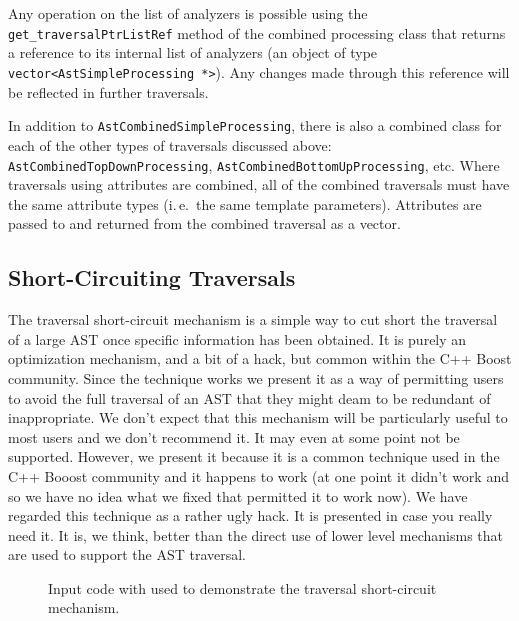 Any operation on the list of analyzers is possible using the {\tt
get\_traversalPtrListRef} method of the combined processing class that returns
a reference to its internal list of analyzers (an object of type {\tt
vector<AstSimpleProcessing *>}). Any changes made through this reference will
be reflected in further traversals.

In addition to {\tt AstCombinedSimpleProcessing}, there is also a combined
class for each of the other types of traversals discussed above: {\tt
AstCombinedTopDownProcessing}, {\tt AstCombinedBottomUpProcessing}, etc. Where
traversals using attributes are combined, all of the combined traversals must
have the same attribute types (i.\,e.~the same template parameters). Attributes
are passed to and returned from the combined traversal as a vector.

\clearpage
\subsection{Short-Circuiting Traversals}

   The traversal short-circuit mechanism is a simple way to cut short
the traversal of a large AST once specific information has been obtained.
It is purely an optimization mechanism, and a bit of a hack, but common
within the C++ Boost community.  Since the technique works we present it
as a way of permitting users to avoid the full traversal of an AST
that they might deam to be redundant of inappropriate.  We don't
expect that this mechanism will be particularly useful to most users
and we don't recommend it.  It may even at some point not be supported.
However, we present it because it is a common technique used in the C++ 
Booost community and it happens to work (at one point it didn't work and
so we have no idea what we fixed that permitted it to work now).  We have
regarded this technique as a rather ugly hack.  It is presented in case
you really need it.  It is, we think, better than the direct use of lower
level mechanisms that are used to support the AST traversal.

\begin{figure}[!h]
{\indent
{\mySmallFontSize

\begin{latexonly}
   
\end{latexonly}

\begin{htmlonly}
   
\end{htmlonly}
}
}
\caption{Input code with used to demonstrate the traversal short-circuit mechanism.}
\label{Tutorial:exampleInputCode_ExampleLoopNestingInfoProcessing}
\end{figure}

